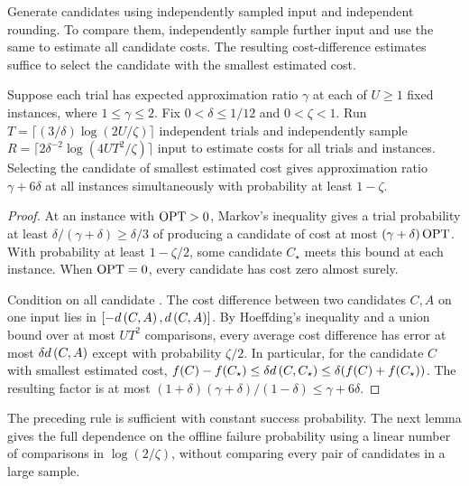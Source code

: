Generate candidates using independently sampled input \clusterings and
independent rounding. To compare them, independently sample further
input \clusterings and use the same \clusterings to estimate all candidate
costs. The resulting cost-difference estimates suffice to select the
candidate with the smallest estimated cost.

\begin{lemma}\label{lem:select-simple}
Suppose each trial has expected approximation ratio $\gamma$ at
each of $U\ge1$ fixed instances, where $1\le\gamma\le2$.
Fix $0<\delta\le1/12$ and $0<\zeta<1$. Run
$T=\lceil (3/\delta)\log(2U/\zeta)\rceil$ independent trials and independently
sample $R=\lceil2\delta^{-2}\log(4UT^2/\zeta)\rceil$ input \clusterings
to estimate costs for all trials and instances. Selecting the candidate of smallest estimated cost gives
approximation ratio $\gamma+6\delta$ at all instances simultaneously
with probability at least $1-\zeta$.
\end{lemma}
\begin{proof}
At an instance with $\operatorname{OPT}>0$, Markov's inequality gives a trial
probability at least $\delta/(\gamma+\delta)\ge\delta/3$ of producing
a candidate of cost at most $(\gamma+\delta)\operatorname{OPT}$. With probability
at least $1-\zeta/2$, some candidate $C_\star$ meets this bound at each
instance. When $\operatorname{OPT}=0$, every candidate has cost zero almost surely.

Condition on all candidate \clusterings. The cost difference between two candidates
$C,A$ on one input lies in $[-d\left(C,A\right),d\left(C,A\right)]$. By Hoeffding's inequality
and a union bound over at most $UT^2$ comparisons, every average cost
difference has error at most $\delta d\left(C,A\right)$ except with probability
$\zeta/2$. In particular, for the candidate $C$ with smallest estimated
cost, $f(C)-f(C_\star)\le\delta d\left(C,C_\star\right)\le\delta(f(C)+f(C_\star))$.
The resulting factor is at most
$(1+\delta)(\gamma+\delta)/(1-\delta)\le\gamma+6\delta$.
\end{proof}

The preceding rule is sufficient with constant success probability. The next
lemma gives the full dependence on the offline failure probability using a linear number
of comparisons in $\log(2/\zeta)$, without comparing every pair of
candidates in a large sample.

